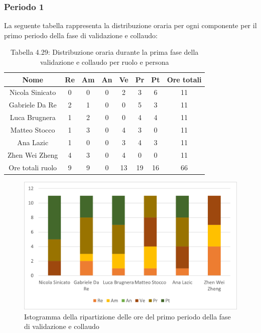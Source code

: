 \subsubsection{Periodo 1}
%
La seguente tabella rappresenta la distribuzione oraria per ogni componente per il primo periodo della fase di validazione e collaudo:
\begin{table}[h]
	\setlength\extrarowheight{5pt}
	\centering
	\begin{tabularx}{\textwidth}{|ccccccc|c|}
		\hline
		\rowcolor{white}
		\textbf{Nome} & \textbf{Re} & \textbf{Am} & \textbf{An} & \textbf{Ve} & \textbf{Pr}& \textbf{Pt} & \textbf{Ore totali} \\
		\hline
		Nicola Sinicato &0&0&0&2&3&6&11 \\
		Gabriele Da Re &2&1&0&0&5&3&11 \\
		Luca Brugnera &1&2&0&0&4&4&11 \\
		Matteo Stocco &1&3&0&4&3&0&11 \\
		Ana Lazic &1&0&0&3&4&3&11 \\
		Zhen Wei Zheng &4&3&0&4&0&0&11 \\
		\hline
		Ore totali ruolo &9&9&0&13&19&16&66 \\
		\hline
	\end{tabularx}
	\vspace{10pt}
	\caption{Tabella 4.29: Distribuzione oraria durante la prima fase della validazione e collaudo per ruolo e persona}
\end{table}
\begin{figure}[H]
    \centering
    \includegraphics[scale=0.6]{img/grafi preventivo/istogrammi/validazione/periodo1.png}
    \caption{Istogramma della ripartizione delle ore del primo periodo della fase di validazione e collaudo}
\end{figure}
